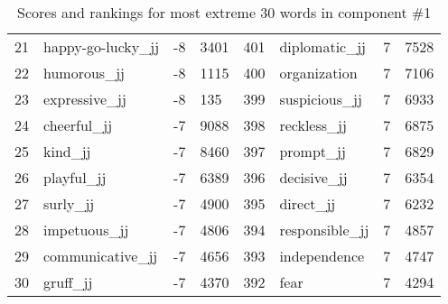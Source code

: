\begin{table}[tbp]
\begin{tabular}{| rlr@{.}l | rlr@{.}l |}
    21 & happy-go-lucky\_jj & -8 & 3401    &    401 & diplomatic\_jj & 7 & 7528 \\
    22 & humorous\_jj & -8 & 1115    &    400 & organization & 7 & 7106 \\
    23 & expressive\_jj & -8 & 135    &    399 & suspicious\_jj & 7 & 6933 \\
    24 & cheerful\_jj & -7 & 9088    &    398 & reckless\_jj & 7 & 6875 \\
    25 & kind\_jj & -7 & 8460    &    397 & prompt\_jj & 7 & 6829 \\
    26 & playful\_jj & -7 & 6389    &    396 & decisive\_jj & 7 & 6354 \\
    27 & surly\_jj & -7 & 4900    &    395 & direct\_jj & 7 & 6232 \\
    28 & impetuous\_jj & -7 & 4806    &    394 & responsible\_jj & 7 & 4857 \\
    29 & communicative\_jj & -7 & 4656    &    393 & independence & 7 & 4747 \\
    30 & gruff\_jj & -7 & 4370    &    392 & fear & 7 & 4294 \\
    \hline
    \end{tabular}
    \caption{Scores and rankings for most extreme 30 words in component \#1} 
\end{table}
\clearpage
